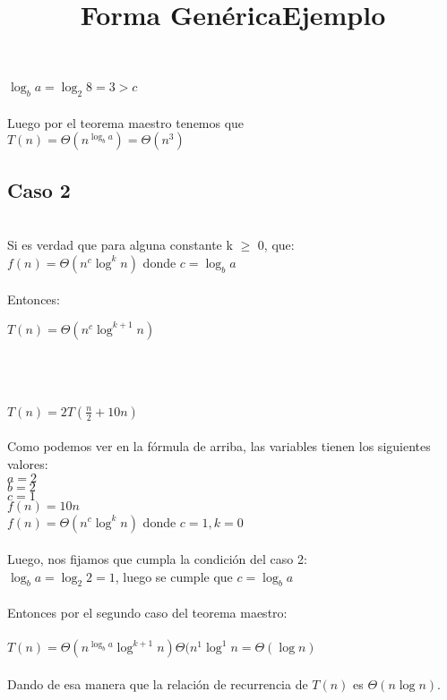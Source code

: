\documentclass{article}
\begin{document}
$\log_{b}{a} = \log_{2}{8} = 3 > c$\\\\
Luego por el teorema maestro tenemos que\\

$T(n) = \Theta(n^{\log_{b}{a}}) = \Theta(n^3)$
\subsection{Caso 2}
\title{\textbf{Forma Genérica}}\\
Si es verdad que para alguna constante k $\geq$ 0, que:\\

$f(n) = \Theta(n^{c}\log^{k}n)$ donde $c=\log_{b}{a}$\\\\
Entonces:

$T(n) = \Theta(n^{c}\log^{k+1}n)$\\\\
\title{\textbf{Ejemplo}}\\\\
$T(n) = 2T(\frac{n}{2}+10n)$\\\\
Como podemos ver en la fórmula de arriba, las variables tienen los siguientes valores:\\

$a=2$\\

$b=2$\\

$c=1$\\

$f(n) = 10n$\\

$f(n) = \Theta(n^{c}\log^{k}n)$ donde $c=1, k=0$\\\\
Luego, nos fijamos que cumpla la condición del caso 2:\\

$\log_{b}{a}=\log_{2}{2}=1$, luego se cumple que $c=\log_{b}{a}$\\\\
Entonces por el segundo caso del teorema maestro:\\\\

$T(n)=\Theta(n^{\log_{b}{a}}\log^{k+1}n)\Theta(n^{1}\log^{1}n=\Theta(\log{n})$\\\\
Dando de esa manera que la relación de recurrencia de $T(n)$ es $\Theta(n\log{n}).$\\
\end{document}

